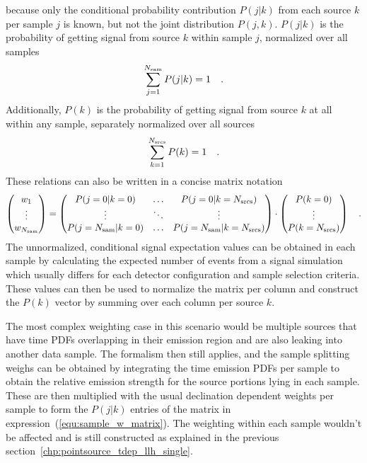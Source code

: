 because only the conditional probability contribution $P(j|k)$ from each source $k$ per sample $j$ is known, but not the joint distribution $P(j,k)$.
$P(j|k)$ is the probability of getting signal from source $k$ within sample $j$, normalized over all samples
\begin{equation}
  \sum_{j=1}^{N_\text{sam}} P(j|k) = 1
  \quad\text{.}
\end{equation}
Additionally, $P(k)$ is the probability of getting signal from source $k$ at all within any sample, separately normalized over all sources
\begin{equation}
  \sum_{k=1}^{N_\text{srcs}} P(k) = 1
  \quad\text{.}
\end{equation}
These relations can also be written in a concise matrix notation
\begin{equation}
  \label{equ:sample_w_matrix}
  \begin{pmatrix} w_1 \\ \vdots \\ w_{N_\text{sam}} \end{pmatrix} =
    \begin{pmatrix}
      P(j=0|k=0) & \dots & P(j=0|k=N_\text{srcs}) \\
      \vdots & \ddots & \vdots \\
      P(j=N_\text{sam}|k=0) & \dots & P(j=N_\text{sam}|k=N_\text{srcs})
    \end{pmatrix} \cdot
    \begin{pmatrix}
      P(k=0) \\ \vdots \\ P(k=N_\text{srcs})
    \end{pmatrix}
  \quad\text{.}
\end{equation}
The unnormalized, conditional signal expectation values can be obtained in each sample by calculating the expected number of events from a signal simulation which usually differs for each detector configuration and sample selection criteria.
These values can then be used to normalize the matrix per column and construct the $P(k)$ vector by summing over each column per source $k$.

The most complex weighting case in this scenario would be multiple sources that have time PDFs overlapping in their emission region and are also leaking into another data sample.
The formalism then still applies, and the sample splitting weighs can be obtained by integrating the time emission PDFs per sample to obtain the relative emission strength for the source portions lying in each sample.
These are then multiplied with the usual declination dependent weights per sample to form the $P(j|k)$ entries of the matrix in expression~(\ref{equ:sample_w_matrix}).
The weighting within each sample wouldn't be affected and is still constructed as explained in the previous section~\ref{chp:pointsource_tdep_llh_single}.

